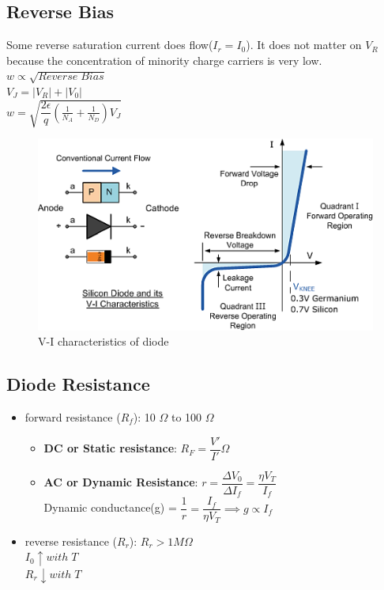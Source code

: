 \documentclass[10pt, a4paper]{report}
\begin{document}
	\subsection{Reverse Bias}
	Some reverse saturation current does flow($ I_r = I_0 $). It does not matter on $ V_R $ because the concentration of minority charge carriers is very low. \\
	$ w \propto \sqrt{Reverse \; Bias} $ \\
	$ V_J = |V_{R}| +| V_0 |$ \\
	$ w = \sqrt{\dfrac{2\epsilon}{q}(\frac{1}{N_A} + \frac{1}{N_D}) V_J} $
	\begin{figure}[h!]
		\centering
		\includegraphics[width=0.7\linewidth]{img/vi-characteristics}
		\caption{V-I characteristics of diode}
		\label{fig:vi-characteristics}
	\end{figure}

	\subsection{Diode Resistance}
	\begin{itemize}
		\item forward resistance ($ R_f $): 10 $\Omega$ to 100 $\Omega$
		\begin{itemize}
			\item \textbf{DC or Static resistance}: $ R_F = \dfrac{V'}{I'} \Omega $
			\item \textbf{AC or Dynamic Resistance}: $ r = \dfrac{\Delta V_0}{\Delta I_f} = \dfrac{\eta V_T}{I_f}$\\
			Dynamic conductance(g) = $ \dfrac{1}{r}  = \dfrac{I_f}{\eta V_T} \implies g \propto I_f $
		\end{itemize}
		\item reverse resistance ($ R_r $): $ R_r > 1M\Omega $ \\
		$ I_0 \uparrow with \; T $ \\
		$ R_r \downarrow with \; T $
	\end{itemize}
\end{document}
